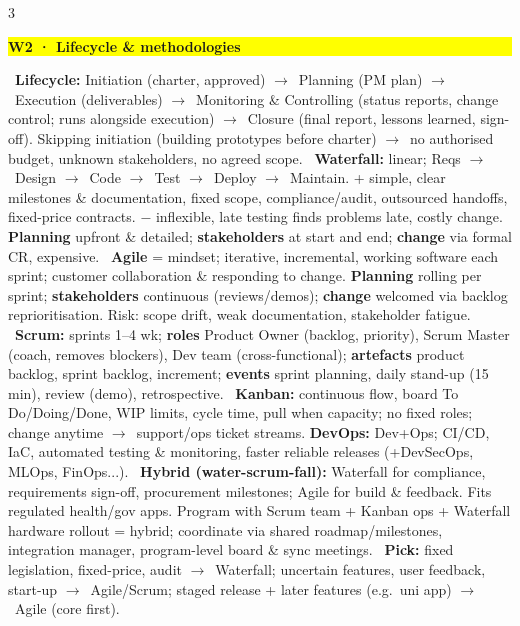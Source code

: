\documentclass[a4paper,landscape]{article}
\newcommand{\hlhighlight}[1]{\begingroup\setlength{\fboxsep}{0pt}\colorbox{yellow}{\strut\textbf{#1}}\endgroup}
\newcommand{\concept}[1]{\textbf{#1}}
\newcommand{\lbl}[1]{\textbf{#1}}
\newcommand{\kh}[1]{{\setlength{\fboxsep}{0.5pt}\colorbox{keyhlcolor}{#1}}}
\newcommand{\ra}{$\rightarrow$}
\begin{document}
\begin{multicols}{3}
\par\smallskip\noindent\hlhighlight{W2 · Lifecycle \& methodologies}\ \concept{Lifecycle:} Initiation (charter, approved) \ra\ Planning (PM plan) \ra\ Execution (deliverables) \ra\ Monitoring \& Controlling (status reports, change control; runs alongside execution) \ra\ Closure (final report, lessons learned, sign-off). Skipping initiation (building prototypes before charter) \ra\ no authorised budget, unknown stakeholders, no agreed scope. \textbullet\ \concept{Waterfall:} linear; Reqs \ra\ Design \ra\ Code \ra\ Test \ra\ Deploy \ra\ Maintain. + simple, clear milestones \& documentation, fixed scope, compliance/audit, outsourced handoffs, fixed-price contracts. $-$ inflexible, late testing finds problems late, costly change. \lbl{Planning} upfront \& detailed; \lbl{stakeholders} at start and end; \lbl{change} via formal CR, expensive. \textbullet\ \concept{Agile} = mindset; iterative, incremental, working software each sprint; customer collaboration \& responding to change. \lbl{Planning} rolling per sprint; \lbl{stakeholders} continuous (reviews/demos); \lbl{change} welcomed via backlog reprioritisation. Risk: scope drift, weak documentation, stakeholder fatigue. \textbullet\ \concept{Scrum:} sprints 1--4 wk; \lbl{roles} Product Owner (backlog, priority), Scrum Master (coach, removes blockers), Dev team (cross-functional); \lbl{artefacts} product backlog, sprint backlog, increment; \lbl{events} sprint planning, daily stand-up (15 min), review (demo), retrospective. \textbullet\ \concept{Kanban:} continuous flow, board To Do/Doing/Done, \kh{WIP limits}, cycle time, pull when capacity; no fixed roles; change anytime \ra\ support/ops ticket streams. \concept{DevOps:} Dev+Ops; CI/CD, IaC, automated testing \& monitoring, faster reliable releases (+DevSecOps, MLOps, FinOps...). \textbullet\ \concept{Hybrid (water-scrum-fall):} Waterfall for compliance, requirements sign-off, procurement milestones; Agile for build \& feedback. Fits regulated health/gov apps. Program with Scrum team + Kanban ops + Waterfall hardware rollout = hybrid; coordinate via shared roadmap/milestones, integration manager, program-level board \& sync meetings. \textbullet\ \lbl{Pick:} fixed legislation, fixed-price, audit \ra\ Waterfall; uncertain features, user feedback, start-up \ra\ Agile/Scrum; staged release + later features (e.g.\ uni app) \ra\ Agile (core first).\par


\end{multicols}
\end{document}
